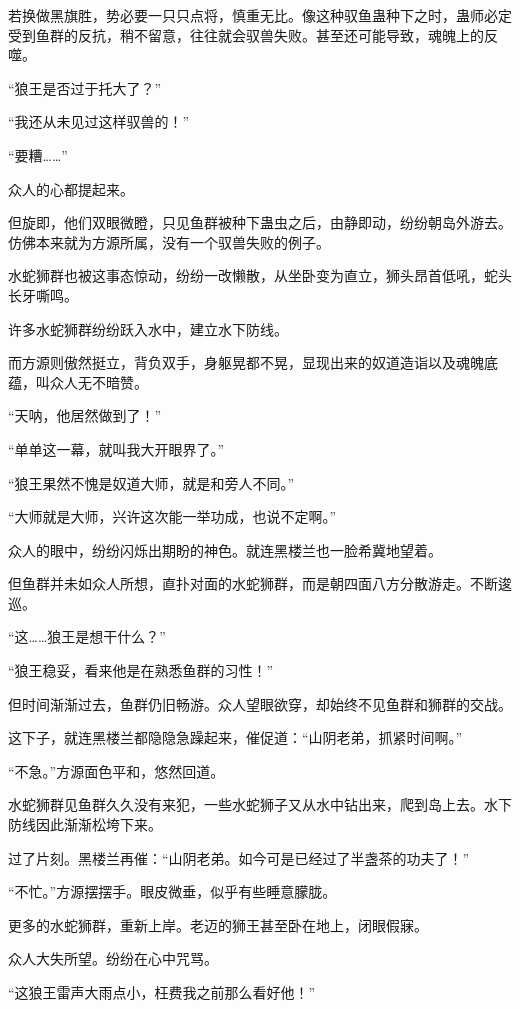\begin{this_body}
若换做黑旗胜，势必要一只只点将，慎重无比。像这种驭鱼蛊种下之时，蛊师必定受到鱼群的反抗，稍不留意，往往就会驭兽失败。甚至还可能导致，魂魄上的反噬。

“狼王是否过于托大了？”

“我还从未见过这样驭兽的！”

“要糟……”

众人的心都提起来。

但旋即，他们双眼微瞪，只见鱼群被种下蛊虫之后，由静即动，纷纷朝岛外游去。仿佛本来就为方源所属，没有一个驭兽失败的例子。

水蛇狮群也被这事态惊动，纷纷一改懒散，从坐卧变为直立，狮头昂首低吼，蛇头长牙嘶鸣。

许多水蛇狮群纷纷跃入水中，建立水下防线。

而方源则傲然挺立，背负双手，身躯晃都不晃，显现出来的奴道造诣以及魂魄底蕴，叫众人无不暗赞。

“天呐，他居然做到了！”

“单单这一幕，就叫我大开眼界了。”

“狼王果然不愧是奴道大师，就是和旁人不同。”

“大师就是大师，兴许这次能一举功成，也说不定啊。”

众人的眼中，纷纷闪烁出期盼的神色。就连黑楼兰也一脸希冀地望着。

但鱼群并未如众人所想，直扑对面的水蛇狮群，而是朝四面八方分散游走。不断逡巡。

“这……狼王是想干什么？”

“狼王稳妥，看来他是在熟悉鱼群的习性！”

但时间渐渐过去，鱼群仍旧畅游。众人望眼欲穿，却始终不见鱼群和狮群的交战。

这下子，就连黑楼兰都隐隐急躁起来，催促道：“山阴老弟，抓紧时间啊。”

“不急。”方源面色平和，悠然回道。

水蛇狮群见鱼群久久没有来犯，一些水蛇狮子又从水中钻出来，爬到岛上去。水下防线因此渐渐松垮下来。

过了片刻。黑楼兰再催：“山阴老弟。如今可是已经过了半盏茶的功夫了！”

“不忙。”方源摆摆手。眼皮微垂，似乎有些睡意朦胧。

更多的水蛇狮群，重新上岸。老迈的狮王甚至卧在地上，闭眼假寐。

众人大失所望。纷纷在心中咒骂。

“这狼王雷声大雨点小，枉费我之前那么看好他！”


\end{this_body}

